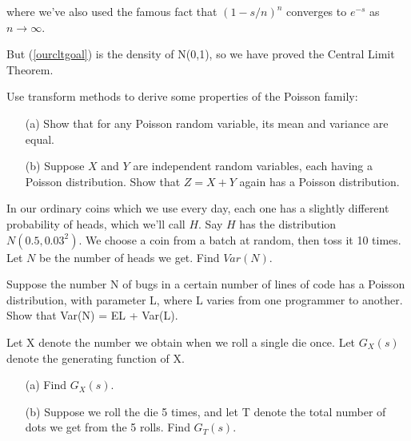 where we've also used the famous fact that $(1 - s/n)^n$ converges to
$e^{-s}$ as $n \rightarrow \infty$.

But (\ref{ourcltgoal}) is the density of N(0,1), so we have proved the
Central Limit Theorem.

\startproblemset

\oneproblem
Use transform methods to derive some properties of the Poisson family:

\begin{itemize}

\item [(a)] Show that for any Poisson random variable, its mean and
variance are equal.

\item [(b)] Suppose $X$ and $Y$ are independent random variables, each
having a Poisson distribution.  Show that $Z = X+Y$ again has a Poisson
distribution.

\end{itemize}

\oneproblem
In our ordinary coins which we use every day, each one has a slightly 
different probability of heads, which we'll call $H$.  Say $H$ has 
the distribution $N(0.5, 0.03^2)$.  We choose a coin from a batch at 
random, then toss it 10 times.  Let $N$ be the number of heads we get.  
Find $Var(N)$.


\oneproblem
Suppose the number N of bugs in a certain number of lines of code has a
Poisson distribution, with parameter L, where L varies from one
programmer to another. Show that Var(N) = EL + Var(L).

\oneproblem
Let X denote the number we obtain when we roll a single die
once.  Let $G_X(s)$ denote the generating function of X.

\begin{itemize}

\item [(a)] Find $G_X(s)$.

\item [(b)] Suppose we roll the die 5 times, and let T denote the
total number of dots we get from the 5 rolls.  Find $G_T(s)$.

\end{itemize}

